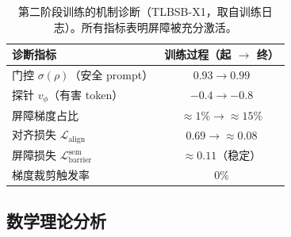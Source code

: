 \documentclass[lettersize,journal]{IEEEtran}
\begin{document}
\begin{table}[t]
\centering
\caption{第二阶段训练的机制诊断（TLBSB-X1，取自训练日志）。所有指标表明屏障被充分激活。}
\label{tab:diag}
\begin{tabular}{lc}
\toprule
诊断指标 & 训练过程（起 $\to$ 终） \\
\midrule
门控 $\sigma(\rho)$（安全 prompt） & $0.93 \to 0.99$ \\
探针 $v_\phi$（有害 token） & $-0.4 \to -0.8$ \\
屏障梯度占比 & $\approx 1\% \to \approx 15\%$ \\
对齐损失 $\mathcal{L}_{\text{align}}$ & $0.69 \to \approx 0.08$ \\
屏障损失 $\mathcal{L}^{\text{sem}}_{\text{barrier}}$ & $\approx 0.11$（稳定） \\
梯度裁剪触发率 & $0\%$ \\
\bottomrule
\end{tabular}
\end{table}





\appendix
\subsection*{数学理论分析}
\end{document}

